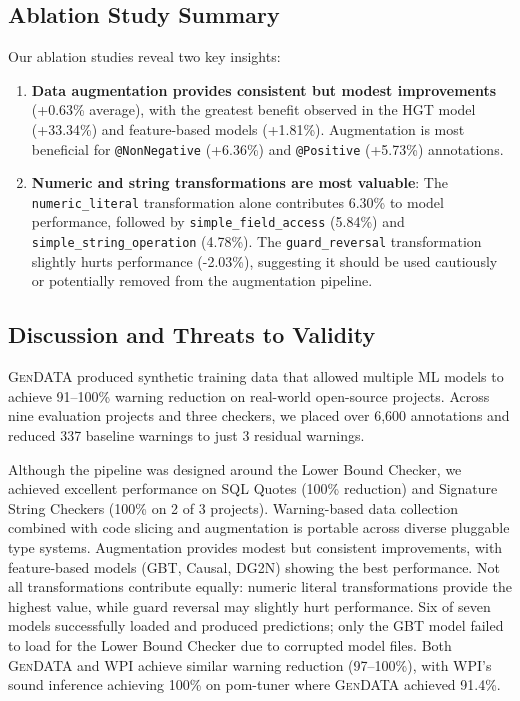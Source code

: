 \documentclass[acmsmall,screen,review,anonymous]{acmart}
\makeatletter
\newcommand{\gendata}{\textsc{GenDATA}\xspace}
\newcommand{\atmark}[1]{\texttt{@#1}}
\makeatother
\begin{document}
\subsection{Ablation Study Summary}
\label{sec:ablationsummary}

Our ablation studies reveal two key insights:

\begin{enumerate}
    \item \textbf{Data augmentation provides consistent but modest improvements} (+0.63\% average), with the greatest benefit observed in the HGT model (+33.34\%) and feature-based models (+1.81\%). Augmentation is most beneficial for \atmark{NonNegative} (+6.36\%) and \atmark{Positive} (+5.73\%) annotations.
    
    \item \textbf{Numeric and string transformations are most valuable}: The \texttt{numeric\_literal} transformation alone contributes 6.30\% to model performance, followed by \texttt{simple\_field\_access} (5.84\%) and \texttt{simple\_string\_operation} (4.78\%). The \texttt{guard\_reversal} transformation slightly hurts performance (-2.03\%), suggesting it should be used cautiously or potentially removed from the augmentation pipeline.
\end{enumerate}

\subsection{Discussion and Threats to Validity}
\label{sec:discussion}

\gendata produced synthetic training data that allowed multiple ML models to achieve 91--100\% warning reduction on real-world open-source projects. Across nine evaluation projects and three checkers, we placed over 6,600 annotations and reduced 337 baseline warnings to just 3 residual warnings.

Although the pipeline was designed around the Lower Bound Checker, we achieved excellent performance on SQL Quotes (100\% reduction) and Signature String Checkers (100\% on 2 of 3 projects). Warning-based data collection combined with code slicing and augmentation is portable across diverse pluggable type systems. Augmentation provides modest but consistent improvements, with feature-based models (GBT, Causal, DG2N) showing the best performance. Not all transformations contribute equally: numeric literal transformations provide the highest value, while guard reversal may slightly hurt performance. Six of seven models successfully loaded and produced predictions; only the GBT model failed to load for the Lower Bound Checker due to corrupted model files. Both \gendata and WPI achieve similar warning reduction (97--100\%), with WPI's sound inference achieving 100\% on pom-tuner where \gendata achieved 91.4\%.
\end{document}
